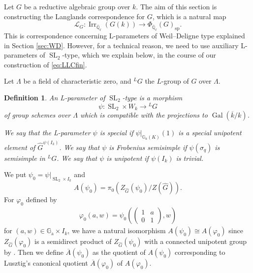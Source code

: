 \documentclass[12pt,a4paper]{article}
\newtheorem{defn}[thm]{Definition}
\DeclareMathOperator{\Gal}{Gal}
\DeclareMathOperator{\Irr}{Irr}
\DeclareMathOperator{\SL}{SL}
\newcommand{\mb}{\mathbb}
\newcommand{\mc}{\mathcal}
\newcommand{\mr}{\mathrm}
\newcommand{\ol}{\overline}
\newcommand{\wh}{\widehat}
\newcommand{\Ga}{\mathbb{G}_{\mathrm{a}}}
\begin{document}
Let $G$ be a reductive algebraic group over $k$. 
The aim of this section is constructing the Langlands correspondence for $G$, which is a natural map 
\begin{equation}\label{eq:LLCfin}
\mc{L}_G \colon \Irr_{\ol{\mb{Q}}_{\ell}}(G(k)) \to 
\Phi_{\ol{\mb{Q}}_{\ell}}(G)_{\mr{sp}}. 
\end{equation}
This is correspondence concerning L-parameters of Weil--Deligne type explained in Section \ref{sec:WD}. 
However, for a technical reason, we need to use auxiliary L-parameters of $\SL_2$-type, which we explain below, in the course of our construction of \eqref{eq:LLCfin}. 

Let $\Lambda$ be a field of characteristic zero, 
and ${}^L G$ the $L$-group of $G$ over $\Lambda$. 

\begin{defn}
An L-parameter of $\SL_2$-type is a morphism 
      \begin{equation}
        \psi \colon \SL_2 \times W_k \rightarrow {}^L G 
      \end{equation} 
      of group schemes over $\Lambda$ which is 
compatible with the projections to $\Gal
        (\ol{k}/k)$. 

We say that the L-parameter $\psi$ is special 
if $\psi|_{\mb{G}_a(K)}(1)$ is a special unipotent element of 
$\wh{G}^{\psi(I_k)}$. 
We say that $\psi$ is Frobenius semisimple if
$\psi(\sigma_q)$ is semisimple in ${}^L G$. 
We say that $\psi$ is unipotent if
$\psi(I_k)$ is trivial. 
\end{defn}

We put $\psi_0=\psi|_{\SL_2 \times I_k}$ and 
\begin{equation}
A(\psi_0)=\pi_0 \left( Z_{\wh{G}}(\psi_0)/Z(\wh{G}) \right). 
\end{equation}
For $\varphi_0$ defined by 
\begin{eqnarray*}
 \varphi_0 (a ,w) =\psi_0 \left( 
 \begin{pmatrix}
 	1 & a \\ 0 & 1 
 \end{pmatrix}, w \right)
\end{eqnarray*}
for $(a,w) \in \Ga \times I_k$, 
we have a natural isomorphism 
$A (\psi_0) \cong A (\varphi_0)$ since 
$Z_{\wh{G}}(\varphi_0)$ is a semidirect product of 
$Z_{\wh{G}}(\psi_0)$ with a connected unipotent group by \cite[Proposition 3.3]{BMIYJMmor}. 
Then we define $\ol{A}(\psi_0)$ as the quotient of $A(\psi_0)$ corresponding to 
Lusztig's canonical quotient $\ol{A}(\varphi_0)$ of $A(\varphi_0)$. 
\end{document}
